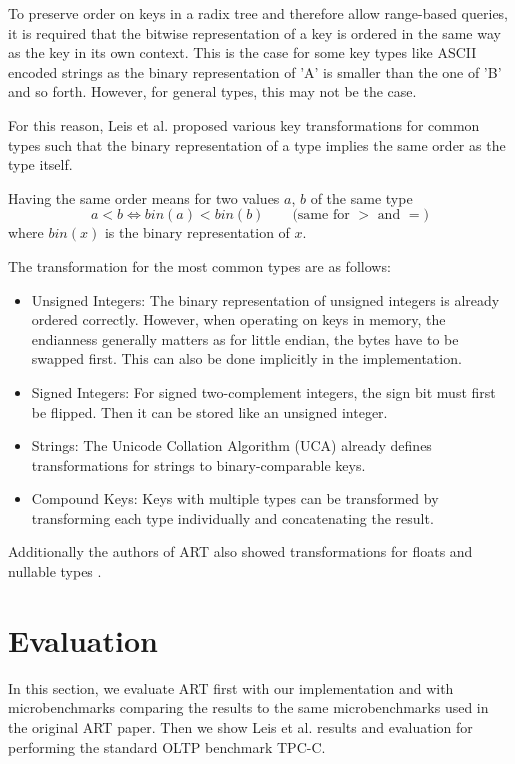 \documentclass[acmtog, nonacm]{acmart}
\begin{document}
To preserve order on keys in a radix tree and therefore allow range-based queries, it is required that the bitwise representation of a key is 
ordered in the same way as the key in its own context. This is the case for some key types like ASCII encoded strings 
as the binary representation of 'A' is smaller than the one of 'B' and so forth. However, for general types, this may not be the case.

For this reason, Leis et al. proposed various key transformations for common types such that the binary 
representation of a type implies the same order as the type itself.

Having the same order means for two values $a$, $b$ of the same type
\[a < b \iff bin(a) <bin(b)\qquad\text{(same for $>$ and $=$)}\]
where $bin(x)$ is the binary representation of $x$.

The transformation for the most common types are as follows:
\begin{itemize}
    \item Unsigned Integers: The binary representation of unsigned integers is already ordered correctly. 
    However, when operating on keys in memory, the endianness generally matters as for little endian, the bytes 
    have to be swapped first. This can also be done implicitly in the implementation.
    \item Signed Integers: For signed two-complement integers, the sign bit must first be flipped. Then it can be 
    stored like an unsigned integer.
    \item Strings: The Unicode Collation Algorithm (UCA) already defines transformations for strings to 
    binary-comparable keys.
    \item Compound Keys: Keys with multiple types can be transformed by transforming each type individually and 
    concatenating the result.
\end{itemize}

Additionally the authors of ART also showed transformations for floats and nullable types \cite{6544812}.

\section{Evaluation}

In this section, we evaluate ART first with our implementation and with microbenchmarks comparing the
results to the same microbenchmarks used in the original ART paper. Then we show Leis et al. results and evaluation 
for performing the
standard OLTP benchmark TPC-C.
\end{document}

